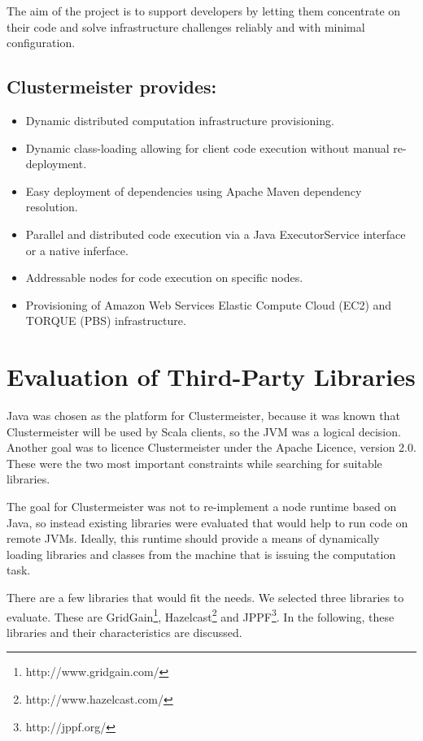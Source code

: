 \documentclass[12pt]{article}
\begin{document}
The aim of the project is to support developers by letting them concentrate on their code and solve infrastructure challenges reliably and with minimal configuration.

\subsection*{Clustermeister provides:}
\begin{itemize}
\item Dynamic distributed computation infrastructure provisioning.
\item Dynamic class-loading allowing for client code execution without manual re-deployment.
\item Easy deployment of dependencies using Apache Maven dependency resolution.
\item Parallel and distributed code execution via a Java ExecutorService interface or a native inferface.
\item Addressable nodes for code execution on specific nodes.
\item Provisioning of Amazon Web Services Elastic Compute Cloud (EC2) and TORQUE (PBS) infrastructure.
\end{itemize}

\section{Evaluation of Third-Party Libraries}

Java was chosen as the platform for Clustermeister, because it was known that Clustermeister will be used by Scala clients, so the JVM was a logical decision. Another goal was to licence Clustermeister under the Apache Licence, version 2.0. These were the two most important constraints while searching for suitable libraries.

The goal for Clustermeister was not to re-implement a node runtime based on Java, so instead existing libraries were evaluated that would help to run code on remote JVMs. Ideally, this runtime should provide a means of dynamically loading libraries and classes from the machine that is issuing the computation task.

There are a few libraries that would fit the needs. We selected three libraries to evaluate. These are 
GridGain\footnote{http://www.gridgain.com/}, 
Hazelcast\footnote{http://www.hazelcast.com/} and 
JPPF\footnote{http://jppf.org/}. In the following, these libraries and their characteristics are discussed.
\end{document}
